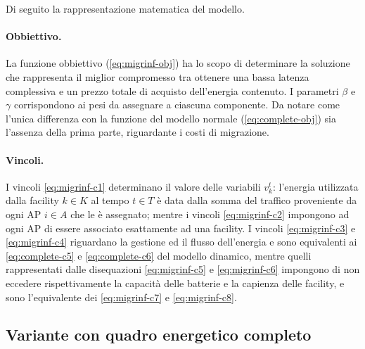 Di seguito la rappresentazione matematica del modello.



\paragraph*{Obbiettivo.}

La funzione obbiettivo (\ref{eq:migrinf-obj}) ha lo scopo di determinare la soluzione che rappresenta il miglior compromesso tra ottenere una bassa latenza complessiva e un prezzo totale di acquisto dell'energia contenuto. I parametri $\beta$ e $\gamma$ corrispondono ai pesi da assegnare a ciascuna componente. Da notare come l'unica differenza con la funzione del modello normale (\ref{eq:complete-obj}) sia l'assenza della prima parte, riguardante i costi di migrazione.

\paragraph*{Vincoli.}

I vincoli \ref{eq:migrinf-c1} determinano il valore delle variabili $v^t_k$: l'energia utilizzata dalla facility $k \in K$ al tempo $t \in T$ è data dalla somma del traffico proveniente da ogni AP $i \in A$ che le è assegnato; mentre i vincoli \ref{eq:migrinf-c2} impongono ad ogni AP di essere associato esattamente ad una facility. I vincoli \ref{eq:migrinf-c3} e \ref{eq:migrinf-c4} riguardano la gestione ed il flusso dell'energia e sono equivalenti ai \ref{eq:complete-c5} e \ref{eq:complete-c6} del modello dinamico, mentre quelli rappresentati dalle disequazioni \ref{eq:migrinf-c5} e \ref{eq:migrinf-c6} impongono di non eccedere rispettivamente la capacità delle batterie e la capienza delle facility, e sono l'equivalente dei \ref{eq:migrinf-c7} e \ref{eq:migrinf-c8}.


\subsection{Variante con quadro energetico completo}
\label{subsec:modello-statico-var}

